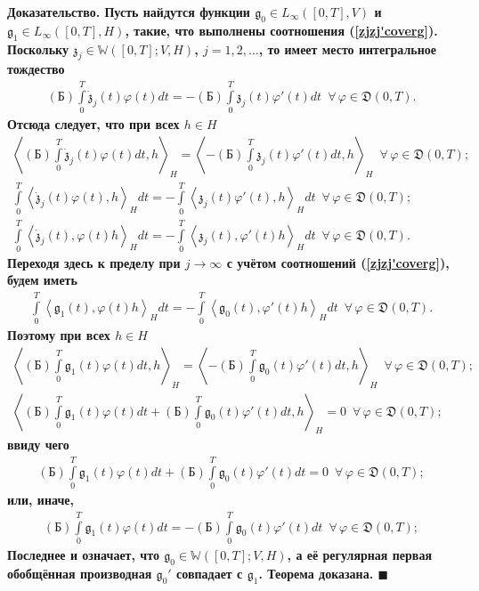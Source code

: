 \documentclass{report}
\newenvironment{Proof}{\par\noindent\bf Доказательство.\rm}{ $\blacksquare$\par}
\begin{document}
\begin{Proof}
Пусть найдутся функции $\mathfrak{g}_0\in L_\infty([0,T],V)$ и $\mathfrak{g}_1\in L_\infty([0,T],H)$, такие, что выполнены соотношения (\ref{zjzj'coverg}). Поскольку
$\mathfrak{z}_j\in\mathbb{W}([0,T];V,H)$, $j=1,2,\dots$, то имеет место интегральное тождество
\begin{gather*}%
(\textrm{Б})\int\limits_0^T\dot{\mathfrak{z}}_{j}(t)\varphi(t)dt=-(\textrm{Б})\int\limits_0^T\mathfrak{z}_{j}(t)\varphi'(t)dt\,\,\,\forall\,
\varphi\in\mathfrak{D}(0,T).
\end{gather*}
Отсюда следует, что при всех $h\in H$
\begin{gather*}
\left\langle(\textrm{Б})\int\limits_0^T\dot{\mathfrak{z}}_{j}(t)\varphi(t)dt,h\right\rangle_H=
\left\langle-(\textrm{Б})\int\limits_0^T\mathfrak{z}_{j}(t)\varphi'(t)dt,h\right\rangle_H\,\,\,\forall\,\varphi\in\mathfrak{D}(0,T);\\
\int\limits_0^T\left\langle\dot{\mathfrak{z}}_{j}(t)\varphi(t),h\right\rangle_Hdt=
-\int\limits_0^T\left\langle\mathfrak{z}_{j}(t)\varphi'(t),h\right\rangle_Hdt\,\,\,\forall\,\varphi\in\mathfrak{D}(0,T);\\
\int\limits_0^T\left\langle\dot{\mathfrak{z}}_{j}(t),\varphi(t)h\right\rangle_Hdt=
-\int\limits_0^T\left\langle\mathfrak{z}_{j}(t),\varphi'(t)h\right\rangle_Hdt\,\,\,\forall\,\varphi\in\mathfrak{D}(0,T).
\end{gather*}
Переходя здесь к пределу при $j\to\infty$ с учётом соотношений (\ref{zjzj'coverg}), будем иметь
\begin{gather*}
\int\limits_0^T\left\langle\mathfrak{g}_{1}(t),\varphi(t)h\right\rangle_Hdt=
-\int\limits_0^T\left\langle\mathfrak{g}_{0}(t),\varphi'(t)h\right\rangle_Hdt\,\,\,\forall\,\varphi\in\mathfrak{D}(0,T).
\end{gather*}
Поэтому при всех $h\in H$
\begin{gather*}
\left\langle(\textrm{Б})\int\limits_0^T\mathfrak{g}_{1}(t)\varphi(t)dt,h\right\rangle_H=
\left\langle-(\textrm{Б})\int\limits_0^T\mathfrak{g}_{0}(t)\varphi'(t)dt,h\right\rangle_H\,\,\,\forall\,\varphi\in\mathfrak{D}(0,T);\\
\left\langle(\textrm{Б})\int\limits_0^T\mathfrak{g}_{1}(t)\varphi(t)dt+
(\textrm{Б})\int\limits_0^T\mathfrak{g}_{0}(t)\varphi'(t)dt,h\right\rangle_H=0\,\,\,\forall\,\varphi\in\mathfrak{D}(0,T);
\end{gather*}
ввиду чего
\begin{gather*}
(\textrm{Б})\int\limits_0^T\mathfrak{g}_{1}(t)\varphi(t)dt+(\textrm{Б})\int\limits_0^T\mathfrak{g}_{0}(t)\varphi'(t)dt=0\,\,\,\forall\,\varphi\in\mathfrak{D}(0,T);
\end{gather*}
или, иначе,
\begin{gather*}
(\textrm{Б})\int\limits_0^T\mathfrak{g}_{1}(t)\varphi(t)dt=-(\textrm{Б})\int\limits_0^T\mathfrak{g}_{0}(t)\varphi'(t)dt\,\,\,\forall\,\varphi\in\mathfrak{D}(0,T);
\end{gather*}
Последнее и означает, что $\mathfrak{g}_0\in\mathbb{W}([0,T];V,H)$, а её регулярная первая обобщённая производная $\mathfrak{g}_0'$ совпадает с $\mathfrak{g}_1$. Теорема доказана.
\end{Proof}
\end{document}
